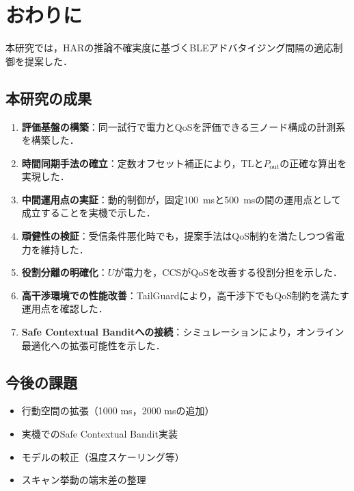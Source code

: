 \chapter{おわりに}

本研究では，HARの推論不確実度に基づくBLEアドバタイジング間隔の適応制御を提案した．

\section{本研究の成果}

\begin{enumerate}
  \item \textbf{評価基盤の構築}：同一試行で電力とQoSを評価できる三ノード構成の計測系を構築した．
  
  \item \textbf{時間同期手法の確立}：定数オフセット補正により，TLと$P_{\mathrm{out}}$の正確な算出を実現した．
  
  \item \textbf{中間運用点の実証}：動的制御が，固定\SI{100}{\milli\second}と\SI{500}{\milli\second}の間の運用点として成立することを実機で示した．
  
  \item \textbf{頑健性の検証}：受信条件悪化時でも，提案手法はQoS制約を満たしつつ省電力を維持した．
  
  \item \textbf{役割分離の明確化}：$U$が電力を，CCSがQoSを改善する役割分担を示した．
  
  \item \textbf{高干渉環境での性能改善}：TailGuardにより，高干渉下でもQoS制約を満たす運用点を確認した．
  
  \item \textbf{Safe Contextual Banditへの接続}：シミュレーションにより，オンライン最適化への拡張可能性を示した．
\end{enumerate}

\section{今後の課題}

\begin{itemize}
  \item 行動空間の拡張（1000 ms，2000 msの追加）
  \item 実機でのSafe Contextual Bandit実装
  \item モデルの較正（温度スケーリング等）
  \item スキャン挙動の端末差の整理
\end{itemize}

